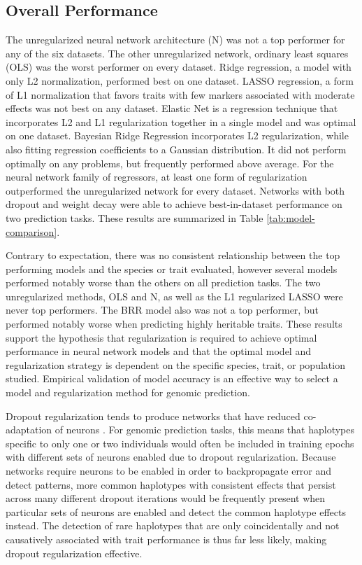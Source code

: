 
\subsection*{Overall Performance}

The unregularized neural network architecture (N) was not a top performer for 
any of the six datasets. The other unregularized network, ordinary least 
squares (OLS) was the worst performer on every dataset. Ridge regression, 
a model with only L2 normalization, performed best on one dataset. 
LASSO regression, a form of L1 normalization that favors traits with few 
markers associated with moderate effects was not best on any dataset. 
Elastic Net is a regression technique that incorporates L2 and L1 
regularization together in a single model and was optimal on one dataset. 
Bayesian Ridge Regression incorporates L2 regularization, while also fitting 
regression coefficients to a Gaussian distribution. It did not perform optimally 
on any problems, but frequently performed above average. For the neural 
network family of regressors, at least one form of regularization 
outperformed the unregularized network for every dataset. Networks with 
both dropout and weight decay were able to achieve best-in-dataset 
performance on two prediction tasks. These results are summarized 
in Table \ref{tab:model-comparison}.

\ifdefined\showtablesandfigures
\fi

Contrary to expectation, there was no consistent relationship between the 
top performing models and the species or trait evaluated, however several 
models performed notably worse than the others on all prediction tasks.
The two unregularized methods, OLS and N, as well as the L1 regularized 
LASSO were never top performers.  The BRR model also was not a top 
performer, but performed notably worse when predicting highly heritable 
traits. These results support the hypothesis that regularization is 
required to achieve optimal performance in neural network models 
and that the optimal model and regularization strategy is dependent 
on the specific species, trait, or population studied. Empirical 
validation of model accuracy is an effective way to select a 
model and regularization method for genomic prediction.

Dropout regularization tends to produce networks that have reduced 
co-adaptation of neurons \citep{srivastava2014}. For genomic prediction 
tasks, this means that haplotypes specific to only one or two 
individuals would often be included in training epochs with 
different sets of neurons enabled due to dropout regularization. Because
networks require neurons to be enabled in order to backpropagate error 
and detect patterns, more common haplotypes with consistent effects 
that persist across many different dropout iterations would be 
frequently present when particular sets of neurons are enabled and detect the
common haplotype effects instead. The detection of rare haplotypes 
that are only coincidentally and not causatively associated with 
trait performance is thus far less likely, making dropout 
regularization effective.

